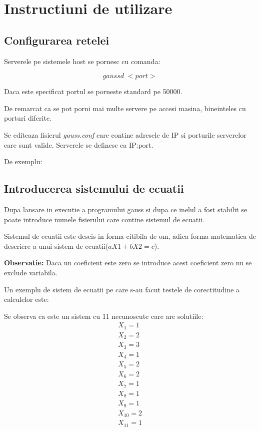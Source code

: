 \chapter{Instructiuni de utilizare}
\section{Configurarea retelei}

\hspace{5mm}Serverele pe sistemele host se pornesc cu comanda:

$$gaussd\; <port>$$

Daca este specificat portul se porneste standard pe 50000.

De remarcat ca se pot porni mai multe servere pe accesi masina, bineinteles
cu porturi diferite.

Se editeaza fisierul {\it gauss.conf} care contine adresele de IP si
porturile serverelor care sunt valide. Serverele se definesc ca IP:port.

De exemplu:



\section{Introducerea sistemului de ecuatii}

\hspace{5mm} Dupa lansare in executie a programului gauss si dupa ce inelul a
fost stabilit se poate introduce numele fisierului care contine sistemul de
ecuatii.

Sistemul de ecuatii este descis in forma citibila de om, adica forma
matematica de descriere a unui sistem de ecuatii($aX1+bX2=c$).

{\bf Observatie:} Daca un coeficient este zero se introduce acest coeficient
zero nu se exclude variabila.

Un exemplu de sistem de ecuatii pe care s-au facut testele  de corectitudine
a calculelor este:

\pagebreak



Se observa ca este un sistem cu 11 necunoscute care are solutiile:
$$\begin{array}{c}
X_1=1\\
X_2=2\\
X_3=3\\
X_4=1\\
X_5=2\\
X_6=2\\
X_7=1\\
X_8=1\\
X_9=1\\
X_{10}=2\\
X_{11}=1\\
\end{array}$$


